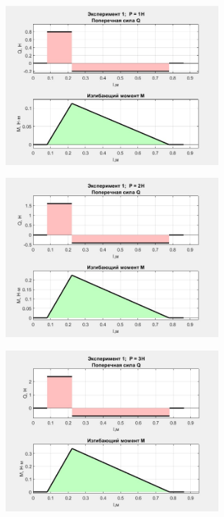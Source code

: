 \documentclass[12pt, a4paper]{article}
\begin{document}
    \begin{figure}[h!]
        \centering
        \vspace{1cm}
        \hspace{-0.5cm}
        \begin{subfigure}{0.4\textwidth}
            \centering
            \includegraphics[width = 8cm]{r_1_1.jpg}
        \end{subfigure}
        \hspace{1.2cm}
        \vspace{0.5cm}
        \begin{subfigure}{0.4\textwidth}
            \centering
            \includegraphics[width = 8cm]{r_1_2.jpg}
        \end{subfigure}
        \vspace{0.5cm}
        \hspace{-0.5cm}
        \begin{subfigure}{0.4\textwidth}
            \centering
            \includegraphics[width = 8cm]{r_1_3.jpg}

\end{subfigure}
\end{figure}
\end{document}
